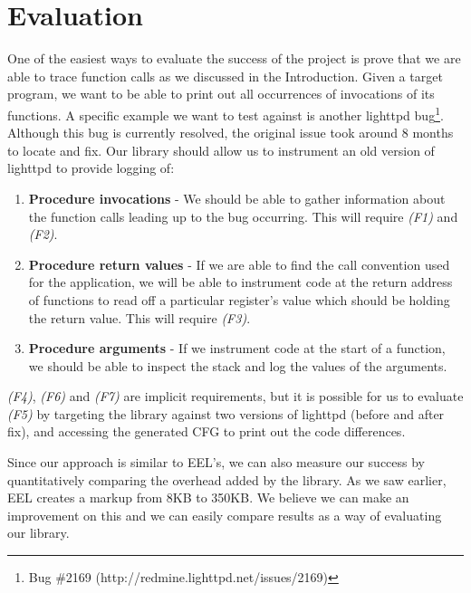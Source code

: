 \section{Evaluation}

One of the easiest ways to evaluate the success of the project is prove that we are able to trace function calls as we discussed in the Introduction. Given a target program, we want to be able to print out all occurrences of invocations of its functions. A specific example we want to test against is another lighttpd bug\footnote{Bug \#2169 (http://redmine.lighttpd.net/issues/2169)}. Although this bug is currently resolved, the original issue took around 8 months to locate and fix. Our library should allow us to instrument an old version of lighttpd to provide logging of:

\begin{enumerate}
 \item \textbf{Procedure invocations} - We should be able to gather information about the function calls leading up to the bug occurring. This will require \emph{(F1)} and \emph{(F2)}.
 \item \textbf{Procedure return values} - If we are able to find the call convention used for the application, we will be able to instrument code at the return address of functions to read off a particular register's value which should be holding the return value. This will require \emph{(F3)}.
 \item \textbf{Procedure arguments} - If we instrument code at the start of a function, we should be able to inspect the stack and log the values of the arguments.
\end{enumerate}

\emph{(F4)}, \emph{(F6)} and \emph{(F7)} are implicit requirements, but it is possible for us to evaluate \emph{(F5)} by targeting the library against two versions of lighttpd (before and after fix), and accessing the generated CFG to print out the code differences.

Since our approach is similar to EEL's, we can also measure our success by quantitatively comparing the overhead added by the library. As we saw earlier, EEL creates a markup from 8KB to 350KB. We believe we can make an improvement on this and we can easily compare results as a way of evaluating our library.